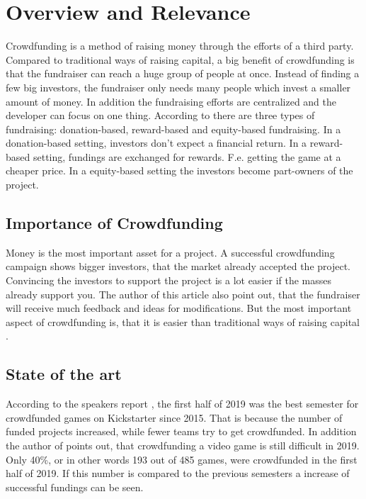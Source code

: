 \documentclass[a4paper]{article}
\begin{document}
\section{Overview and Relevance}


Crowdfunding is a method of raising money through the efforts of a third party. Compared to traditional ways of raising capital, a big benefit of crowdfunding is that the fundraiser can reach a huge group of people at once. Instead of finding a few big investors, the fundraiser only needs many people which invest a smaller amount of money. In addition the fundraising efforts are centralized and the developer can focus on one thing. According to \cite{cfguide} there are three types of fundraising: donation-based, reward-based and equity-based fundraising. In a donation-based setting, investors don't expect a financial return. In a reward-based setting, fundings are exchanged for rewards. F.e. getting the game at a cheaper price. In a equity-based setting the investors become part-owners of the project.

\subsection{Importance of Crowdfunding}
Money is the most important asset for a project. A successful crowdfunding campaign shows bigger investors, that the market already accepted the project. Convincing the investors to support the project is a lot easier if the masses already support you. The author of this article \cite{importance} also point out, that the fundraiser will receive much feedback and ideas for modifications. But the most important aspect of crowdfunding is, that it is easier than traditional ways of raising capital \cite{importance}.

\subsection{State of the art}
According to the speakers report \cite{cavg}, the first half of 2019 was the best semester for crowdfunded games on Kickstarter since 2015. That is because the number of funded projects increased, while fewer teams try to get crowdfunded. In addition the author of \cite{kfg} points out, that crowdfunding a video game is still difficult in 2019. Only 40\%, or in other words 193 out of 485 games, were crowdfunded in the first half of 2019. If this number is compared to the previous semesters a increase of successful fundings can be seen.
\end{document}
